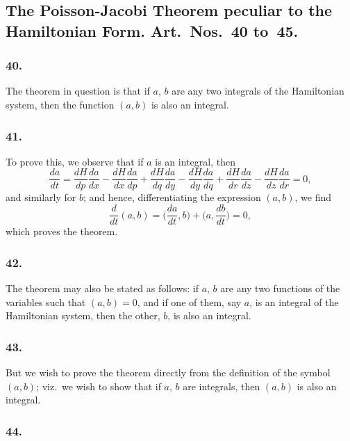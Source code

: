 \documentclass[12pt,a4paper]{article}
\theoremstyle{plain}
\begin{document}
\subsection*{The Poisson-Jacobi Theorem peculiar to the Hamiltonian Form. Art.~Nos.~40 to~45.}

\subsubsection*{40.}

The theorem in question is that if $a$, $b$ are any two integrals of the Hamiltonian system, then the function $(a, b)$ is also an integral.

\subsubsection*{41.}

To prove this, we observe that if $a$ is an integral, then
\[
\frac{da}{dt} = \frac{dH}{dp}\frac{da}{dx} - \frac{dH}{dx}\frac{da}{dp} + \frac{dH}{dq}\frac{da}{dy} - \frac{dH}{dy}\frac{da}{dq} + \frac{dH}{dr}\frac{da}{dz} - \frac{dH}{dz}\frac{da}{dr} = 0,
\]
and similarly for $b$; and hence, differentiating the expression $(a, b)$, we find
\[
\frac{d}{dt}(a, b) = \biggl(\frac{da}{dt}, b\biggr) + \biggl(a, \frac{db}{dt}\biggr) = 0,
\]
which proves the theorem.

\newpage
\setcounter{page}{129}

\subsubsection*{42.}

The theorem may also be stated as follows: if $a$, $b$ are any two functions of the variables such that $(a, b) = 0$, and if one of them, say $a$, is an integral of the Hamiltonian system, then the other, $b$, is also an integral.

\subsubsection*{43.}

But we wish to prove the theorem directly from the definition of the symbol $(a, b)$; viz.~we wish to show that if $a$, $b$ are integrals, then $(a, b)$ is also an integral.

\subsubsection*{44.}
\end{document}
